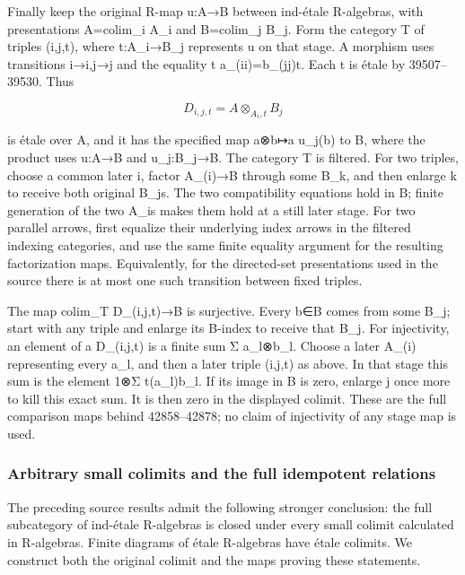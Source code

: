 Finally keep the original R-map u:A→B between ind-étale R-algebras, with presentations A=colim\_i A\_i and B=colim\_j B\_j. Form the category T of triples (i,j,t), where t:A\_i→B\_j represents u on that stage. A morphism uses transitions i→i\textquotesingle,j→j\textquotesingle{} and the equality t\textquotesingle{} a\_(ii\textquotesingle)=b\_(jj\textquotesingle)t. Each t is étale by 39507--39530. Thus

\[
D_{i,j,t}=A\otimes_{A_i,t}B_j
\]

is étale over A, and it has the specified map a⊗b↦a u\_j(b) to B, where the product uses u:A→B and u\_j:B\_j→B. The category T is filtered. For two triples, choose a common later i\textquotesingle, factor A\_(i\textquotesingle)→B through some B\_k, and then enlarge k to receive both original B\_j\textquotesingle s. The two compatibility equations hold in B; finite generation of the two A\_i\textquotesingle s makes them hold at a still later stage. For two parallel arrows, first equalize their underlying index arrows in the filtered indexing categories, and use the same finite equality argument for the resulting factorization maps. Equivalently, for the directed-set presentations used in the source there is at most one such transition between fixed triples.

The map colim\_T D\_(i,j,t)→B is surjective. Every b∈B comes from some B\_j; start with any triple and enlarge its B-index to receive that B\_j. For injectivity, an element of a D\_(i,j,t) is a finite sum Σ a\_l⊗b\_l. Choose a later A\_(i\textquotesingle) representing every a\_l, and then a later triple (i\textquotesingle,j\textquotesingle,t\textquotesingle) as above. In that stage this sum is the element 1⊗Σ t\textquotesingle(a\_l)b\_l. If its image in B is zero, enlarge j\textquotesingle{} once more to kill this exact sum. It is then zero in the displayed colimit. These are the full comparison maps behind 42858--42878; no claim of injectivity of any stage map is used.

\subsubsection{Arbitrary small colimits and the full idempotent relations}\label{algebra-proof-059-arbitrary-small-colimits-and-the-full-idempotent-relations}

The preceding source results admit the following stronger conclusion: the full subcategory of ind-étale R-algebras is closed under every small colimit calculated in R-algebras. Finite diagrams of étale R-algebras have étale colimits. We construct both the original colimit and the maps proving these statements.

